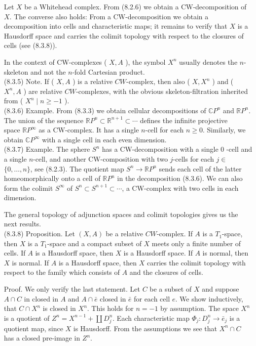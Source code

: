 \documentclass[10pt, letterpaper]{article}
\begin{document}
Let $X$ be a Whitehead complex. From (8.2.6) we obtain a CW-decomposition of $X$. The converse also holds: From a CW-decomposition we obtain a decomposition into cells and characteristic maps; it remains to verify that $X$ is a Hausdorff space and carries the colimit topology with respect to the closures of cells (see (8.3.8)).

In the context of CW-complexes ( $X, A$ ), the symbol $X^{n}$ usually denotes the $n$-skeleton and not the $n$-fold Cartesian product.\\
(8.3.5) Note. If ( $X, A$ ) is a relative $C W$-complex, then also ( $X, X^{n}$ ) and ( $X^{n}, A$ ) are relative $C W$-complexes, with the obvious skeleton-filtration inherited from ( $X^{n} \mid n \geq-1$ ).\\
(8.3.6) Example. From (8.3.3) we obtain cellular decompositions of $\mathbb{C} P^{n}$ and $\mathbb{R} P^{n}$. The union of the sequence $\mathbb{R} P^{n} \subset \mathbb{R}^{n+1} \subset \cdots$ defines the infinite projective\\
space $\mathbb{R} P^{\infty}$ as a CW-complex. It has a single $n$-cell for each $n \geq 0$. Similarly, we obtain $\mathbb{C} P^{\infty}$ with a single cell in each even dimension.\\
(8.3.7) Example. The sphere $S^{n}$ has a CW-decomposition with a single 0 -cell and a single $n$-cell, and another CW-composition with two $j$-cells for each $j \in$ $\{0, \ldots, n\}$, see (8.2.3). The quotient map $S^{n} \rightarrow \mathbb{R} P^{n}$ sends each cell of the latter homeomorphically onto a cell of $\mathbb{R} P^{n}$ in the decomposition (8.3.6). We can also form the colimit $S^{\infty}$ of $S^{n} \subset S^{n+1} \subset \cdots$, a CW-complex with two cells in each dimension.

The general topology of adjunction spaces and colimit topologies gives us the next results.\\
(8.3.8) Proposition. Let $(X, A)$ be a relative $C W$-complex. If $A$ is a $T_{1}$-space, then $X$ is a $T_{1}$-space and a compact subset of $X$ meets only a finite number of cells. If $A$ is a Hausdorff space, then $X$ is a Hausdorff space. If $A$ is normal, then $X$ is normal. If $A$ is a Hausdorff space, then $X$ carries the colimit topology with respect to the family which consists of $A$ and the closures of cells.

Proof. We only verify the last statement. Let $C$ be a subset of $X$ and suppose $A \cap C$ in closed in $A$ and $A \cap \bar{e}$ closed in $\bar{e}$ for each cell $e$. We show inductively, that $C \cap X^{n}$ is closed in $X^{n}$. This holds for $n=-1$ by assumption. The space $X^{n}$ is a quotient of $Z^{n}=X^{n-1}+\coprod D_{j}^{n}$. Each characteristic map $\Phi_{j}: D_{j}^{n} \rightarrow \bar{e}_{j}$ is a quotient map, since $X$ is Hausdorff. From the assumptions we see that $X^{n} \cap C$ has a closed pre-image in $Z^{n}$.
\end{document}
